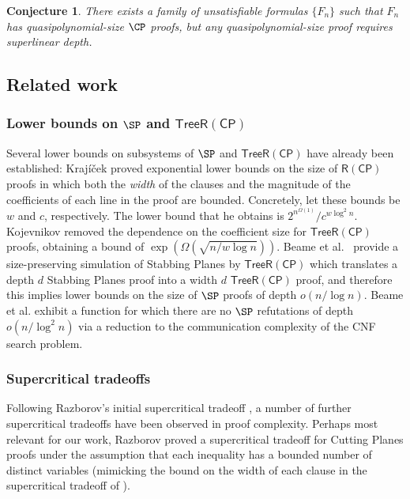 \documentclass[11pt]{article}
\numberwithin{equation}{section}
\newtheorem{conjecture}[theorem]{Conjecture}
\theoremstyle{definition}
\theoremstyle{plain}
\newcommand{\tRCP}{\ensuremath{\mathsf{TreeR(CP)}}}
\newcommand{\RCP}{\ensuremath{\mathsf{R(CP)}}}
\begin{document}
\begin{conjecture}\label{conj:deepProofs}
	There exists a family of unsatisfiable formulas $\{F_n\}$ such that $F_n$ has quasipolynomial-size $\CP$ proofs, but any quasipolynomial-size proof requires superlinear depth.
\end{conjecture}





\subsection{Related work}
%

\subsubsection{Lower bounds on $\SP$ and $\tRCP$} Several lower bounds on subsystems of $\SP$ and $\tRCP$ have already been established: %
Kraj\'{i}\v{c}ek \cite{Krajicek98} proved exponential lower bounds on the size of $\RCP$ proofs in which both the \emph{width} of the clauses and the magnitude of the coefficients of each line in the proof are bounded. Concretely, let these bounds be
$w$ and $c$, respectively. 
The lower bound that he obtains is $2^{n^{\Omega(1)}}/c^{w \log^2 n}$. Kojevnikov \cite{Kojevnikov07} removed the dependence on the coefficient size for $\tRCP$ proofs, obtaining a bound of $\exp(\Omega(\sqrt{n/w \log n}))$. Beame et al.~\cite{BeameFIKPPR18} provide a size-preserving simulation of Stabbing Planes by $\tRCP$ which translates a depth $d$ Stabbing Planes proof into a width $d$ $\tRCP$ proof, %
and therefore this implies lower bounds on the size of $\SP$ proofs of depth $o(n/\log n)$. Beame et al. \cite{BeameFIKPPR18} exhibit a function for which there are no $\SP$ refutations of depth $o(n / \log^2 n)$ via a reduction to the communication complexity of the CNF search problem. %

\subsubsection{Supercritical tradeoffs} %
%
%
%
Following Razborov's initial supercritical tradeoff \cite{Razborov16},  %
a number of
further  %
supercritical tradeoffs have been observed in proof complexity.  
Perhaps most relevant for our work, Razborov \cite{Razborov17} proved a supercritical tradeoff for Cutting Planes proofs under the assumption that each inequality has a bounded number of distinct variables (mimicking the bound on the width of each clause in the supercritical tradeoff of \cite{Razborov16}). 
\end{document}
